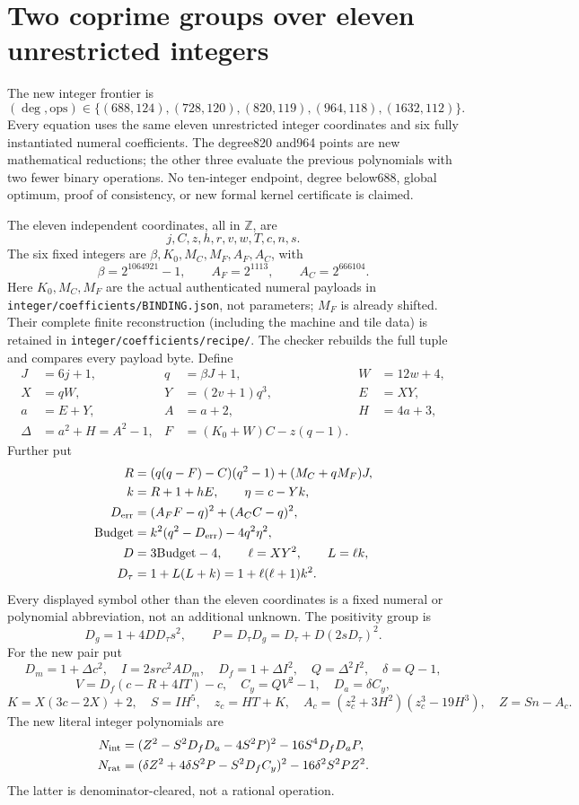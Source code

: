 \section{Two coprime groups over eleven unrestricted integers}
\label{sec:integer-two-groups}
The new integer frontier is
\[
 (\deg,\mathrm{ops})\in\{(688,124),(728,120),(820,119),(964,118),(1632,112)\}.
\]
Every equation uses the same eleven unrestricted integer coordinates and six
fully instantiated numeral coefficients. The degree820 and964 points are new
mathematical reductions; the other three evaluate the previous polynomials
with two fewer binary operations. No ten-integer endpoint, degree below688,
global optimum, proof of consistency, or new formal kernel certificate is claimed.

The eleven independent coordinates, all in $\mathbb Z$, are
\[
 j,C,z,h,r,v,w,T,c,n,s.
\]
The six fixed integers are $\beta,K_0,M_C,M_F,A_F,A_C$, with
\[
 \beta=2^{1064921}-1,\qquad A_F=2^{1113},\qquad A_C=2^{666104}.
\]
Here $K_0,M_C,M_F$ are the actual authenticated numeral payloads in
\texttt{integer/coefficients/BINDING.json}, not parameters; $M_F$ is
already shifted. Their complete finite reconstruction (including the
machine and tile data) is retained in \texttt{integer/coefficients/recipe/}.
The checker rebuilds the full tuple and compares every payload byte.
Define
\begin{align*}
 J&=6j+1,&q&=\beta J+1,&W&=12w+4,\\
 X&=qW,&Y&=(2v+1)q^3,&E&=XY,\\
 a&=E+Y,&A&=a+2,&H&=4a+3,\\
 \Delta&=a^2+H=A^2-1,
 &F&=(K_0+W)C-z(q-1).
\end{align*}
Further put
\begin{align*}
 R&=(q(q-F)-C)(q^2-1)+(M_C+qM_F)J,\\
 k&=R+1+hE,\qquad \eta=c-Yk,\\
 D_{\rm err}&=(A_FF-q)^2+(A_CC-q)^2,\\
 \mathrm{Budget}&=k^2(q^2-D_{\rm err})-4q^2\eta^2,\\
 D&=3\mathrm{Budget}-4,\qquad \ell=XY^2,\qquad L=\ell k,\\
 D_\tau&=1+L(L+k)=1+\ell(\ell+1)k^2.
\end{align*}
Every displayed symbol other than the eleven coordinates is a fixed
numeral or polynomial abbreviation, not an additional unknown.
The positivity group is
\[
 D_g=1+4DD_\tau s^2,\qquad
 P=D_\tau D_g=D_\tau+D(2sD_\tau)^2.
\]
For the new pair put
\[
 D_m=1+\Delta c^2,\quad I=2src^2AD_m,\quad
 D_f=1+\Delta I^2,\quad Q=\Delta^2I^2,\quad\delta=Q-1,
\]
\[
 V=D_f(c-R+4IT)-c,\quad C_y=QV^2-1,\quad D_a=\delta C_y,
\]
\[
 K=X(3c-2X)+2,\quad S=IH^5,\quad z_c=HT+K,
\quad A_c=(z_c^2+3H^2)(z_c^3-19H^3),\quad Z=Sn-A_c.
\]
The new literal integer polynomials are
\begin{align*}
 N_{\rm int}&=(Z^2-S^2D_fD_a-4S^2P)^2-16S^4D_fD_aP,\\
 N_{\rm rat}&=(\delta Z^2+4\delta S^2P-S^2D_fC_y)^2
                  -16\delta^2S^2PZ^2.
\end{align*}
The latter is denominator-cleared, not a rational operation.

